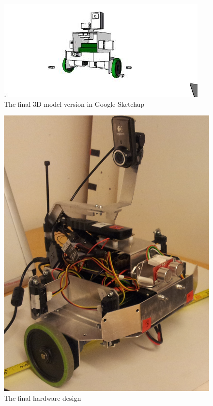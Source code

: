 \begin{figure}[h!]
\label{fig:google_sketchup_draw1}
    \begin{centering}
   	 \includegraphics[scale=0.5]{figures/g_sketchup_v7.jpeg}
   	 \caption{The final 3D model version in Google Sketchup}\label{fig:google_sketchup_draw1}
    \end{centering}
\end{figure}


\begin{figure}[h!]
\label{fig:amee_final}
    \begin{centering}
   	 \includegraphics[scale=0.1]{figures/amee_final.jpg}
   	 \caption{The final hardware design}\label{fig:amee_final}
    \end{centering}
\end{figure}

